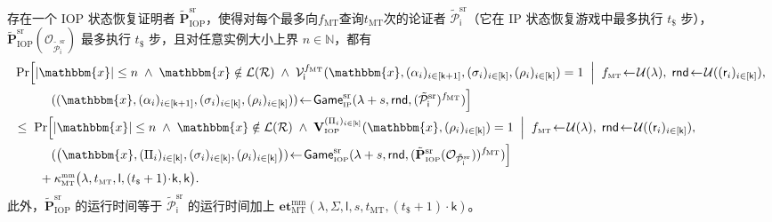 \documentclass[american,singlepageview]{snargs-book-zh}
\newcommand{\Malicious}[1]{\tilde{#1}}
\newcommand{\BlackBox}[1]{\mathcal{O}_{#1}}
\newcommand{\SomeSize}[1]{|#1|}
\newcommand{\Naturals}{\mathbb{N}}
\newcommand{\Relation}{\mathcal{R}}
\newcommand{\Language}{\mathcal{L}}
\newcommand{\GetLanguage}[1]{\Language(#1)}
\newcommand{\Instance}{\mathbbm{x}}
\newcommand{\InstanceSize}{n}
\newcommand{\ProtoProver}{P}
\newcommand{\ProtoVerifier}{V}
\newcommand{\ProtoKnowledgeError}{\kappa}
\newcommand{\ProtoKnowledgeTime}{\mathbf{et}}
\newcommand{\ProtoAlphabet}{\Sigma}
\newcommand{\ProtoRoundComplexity}{\mathsf{k}}
\newcommand{\ProtoProofLength}{\mathsf{l}}
\newcommand{\ProtoRandomnessComplexity}{\mathsf{r}}
\newcommand{\RoundIndex}{i}
\newcommand{\SRSuperscript}{\mathrm{sr}}
\newcommand{\IPSubscript}{\scriptscriptstyle\mathrm{IP}}
\newcommand{\IPRoundComplexity}{\ProtoRoundComplexity}
\newcommand{\IPProverMessage}{\alpha}
\newcommand{\IPVerifierRandomMessage}{\rho}
\newcommand{\IPTuple}[1]{(#1_{\RoundIndex})_{\RoundIndex \in [\IPRoundComplexity]}}
\newcommand{\IOPSubscript}{\scriptscriptstyle\mathrm{IOP}}
\newcommand{\IOPFormat}[1]{\mathbf{#1}}
\newcommand{\IOPVerifier}{\IOPFormat{\ProtoVerifier}_{\IOPSubscript}}
\newcommand{\IOPMaliciousProver}{\Malicious{\IOPFormat{\ProtoProver}}_{\IOPSubscript}}
\newcommand{\IOPString}{\Pi}
\newcommand{\IOPVerifierRandomMessage}{\rho}
\newcommand{\IOPRoundComplexity}{\ProtoRoundComplexity}
\newcommand{\IOPAlphabet}{\ProtoAlphabet}
\newcommand{\IOPProofLength}{\ProtoProofLength}
\newcommand{\IOPRandomnessComplexity}{\ProtoRandomnessComplexity}
\newcommand{\IOPStrings}{(\IOPString_{\RoundIndex})_{\RoundIndex \in [\IOPRoundComplexity]}}
\newcommand{\IOPVerifierRandomMessages}{(\IOPVerifierRandomMessage_{\RoundIndex})_{\RoundIndex \in [\IOPRoundComplexity]}}
\newcommand{\IOPTuple}[1]{(#1_{\RoundIndex})_{\RoundIndex \in [\IOPRoundComplexity]}}
\newcommand{\IOPVerifierInput}{\Instance,\IOPVerifierRandomMessages}
\newcommand{\ARGFormat}[1]{\mathcal{#1}}
\newcommand{\ARGProver}{\ARGFormat{\ProtoProver}}
\newcommand{\ARGVerifier}{\ARGFormat{\ProtoVerifier}}
\newcommand{\ROFunction}{f}
\newcommand{\ROQueryBound}{t}
\newcommand{\RODistribution}[1]{\mathcal{U}(#1)}
\newcommand{\SecurityParameter}{\lambda}
\newcommand{\PrivacyParameter}{s}
\newcommand{\ROTreeSymbol}{\MTSubscript}
\newcommand{\RORandSymbol}{\scriptscriptstyle \mathsf{\$}}
\newcommand{\ROTreeFunction}{\ROFunction_{\ROTreeSymbol}}
\newcommand{\ROTreeQueryBound}{\ROQueryBound_{\ROTreeSymbol}}
\newcommand{\RORandQueryBound}{\ROQueryBound_{\RORandSymbol}}
\newcommand{\MTSubscript}{{\scriptscriptstyle\mathrm{MT}}}
\newcommand{\MTMultiMultiSymbol}{\scriptscriptstyle{\mathrm{mm}}}
\newcommand{\MTMultiMultiExtractionError}{\ProtoKnowledgeError_{\MTSubscript}^{\MTMultiMultiSymbol}}
\newcommand{\MTMultiMultiExtractorTimeSymbol}{\ProtoKnowledgeTime_{\MTSubscript}^{\MTMultiMultiSymbol}}
\newcommand{\MTMultiMultiExtractorTimeFunction}[6]{\MTMultiMultiExtractorTimeSymbol(#1,#2,#3,#4,#5,#6)}
\newcommand{\RandSaltSize}{s}
\newcommand{\IBCSVerifier}{\ARGVerifier_{\mathsf{i}}}
\newcommand{\IBCSMaliciousSRProver}{\Malicious{\ARGProver}_{\mathsf{i}}^{\SRSuperscript}}
\newcommand{\SRSaltString}{\sigma}
\newcommand{\SRSaltStrings}[1]{(\SRSaltString_{\RoundIndex})_{\RoundIndex \in [#1]}}
\newcommand{\SRRandomness}{\mathsf{rnd}}
\newcommand{\SRGameName}[1]{\mathsf{Game}_{#1}^{\SRSuperscript}}
\newcommand{\IPStateRestorationGame}[3]{\SRGameName{\IPSubscript}(#1,#2,#3)}
\newcommand{\IOPStateRestorationGame}[3]{\SRGameName{\IOPSubscript}(#1,#2,#3)}
\newcommand{\IOPMaliciousSRProver}{\IOPMaliciousProver^{\SRSuperscript}}
\newcommand{\IBCSSROutput}{(\Instance,(\IPProverMessage_{\RoundIndex})_{\RoundIndex \in [\IPRoundComplexity+1]},\SRSaltStrings{\IPRoundComplexity},\IPTuple{\IPVerifierRandomMessage})}
\newcommand{\IOPSROutput}{\big(\Instance,\IOPStrings,\SRSaltStrings{\IOPRoundComplexity},\IOPVerifierRandomMessages\big)}
\begin{document}
\begin{lemma}
\label{lemma:ibcs-sr-soundness-reduction}
存在一个 IOP 状态恢复证明者 \(\IOPMaliciousSRProver\)，使得对每个最多向\(\ROTreeFunction\)查询\(\ROTreeQueryBound\)次的论证者 \(\IBCSMaliciousSRProver\)（它在 IP 状态恢复游戏中最多执行 \(\RORandQueryBound\) 步），
\(\IOPMaliciousSRProver(\BlackBox{\IBCSMaliciousSRProver})\) 最多执行 \(\RORandQueryBound\) 步，且对任意实例大小上界 \(\InstanceSize\in\Naturals\)，都有
\begin{align*}
&\Pr
\Bigl[
  \SomeSize{\Instance}\le\InstanceSize
  \;\land\;\Instance\notin\GetLanguage{\Relation}
  \;\land\;\IBCSVerifier^{\ROTreeFunction}\IBCSSROutput=1
\;\Bigm|\;
  \ROTreeFunction\!\gets\!\RODistribution{\SecurityParameter},\;
  \SRRandomness\!\gets\!\RODistribution{\IOPTuple{\IOPRandomnessComplexity}},\\
&\qquad\quad
  (\IBCSSROutput)\!\gets\!\IPStateRestorationGame{\SecurityParameter+\RandSaltSize}{\SRRandomness}{(\IBCSMaliciousSRProver)^{\ROTreeFunction}}
\Bigr]
\\
&\le\;
\Pr
\Bigl[
  \SomeSize{\Instance}\le\InstanceSize
  \;\land\;\Instance\notin\GetLanguage{\Relation}
  \;\land\;\IOPVerifier^{\IOPStrings}(\IOPVerifierInput)=1
\;\Bigm|\;
  \ROTreeFunction\!\gets\!\RODistribution{\SecurityParameter},\;
  \SRRandomness\!\gets\!\RODistribution{\IOPTuple{\IOPRandomnessComplexity}},\\
&\qquad\quad
  (\IOPSROutput)\!\gets\!\IOPStateRestorationGame{\SecurityParameter+\RandSaltSize}{\SRRandomness}{(\IOPMaliciousSRProver(\BlackBox{\IBCSMaliciousSRProver}))^{\ROTreeFunction}}
\Bigr]
\\ &\quad\quad
  +\MTMultiMultiExtractionError\bigl(\SecurityParameter,\ROTreeQueryBound,\IOPProofLength,(\RORandQueryBound+1)\!\cdot\!\IOPRoundComplexity,\IOPRoundComplexity\bigr).
\end{align*}
此外，\(\IOPMaliciousSRProver\) 的运行时间等于 \(\IBCSMaliciousSRProver\) 的运行时间加上
\(\MTMultiMultiExtractorTimeFunction{\SecurityParameter}{\IOPAlphabet}{\IOPProofLength}{\PrivacyParameter}{\ROTreeQueryBound}{(\RORandQueryBound+1)\!\cdot\!\IOPRoundComplexity}\)。
\end{lemma}
\end{document}
